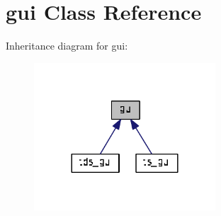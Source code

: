 \hypertarget{classgui}{}\section{gui Class Reference}
\label{classgui}


Inheritance diagram for gui\+:\nopagebreak
\begin{figure}[H]
\begin{center}
\leavevmode
\includegraphics[width=192pt]{classgui__inherit__graph}
\end{center}
\end{figure}

